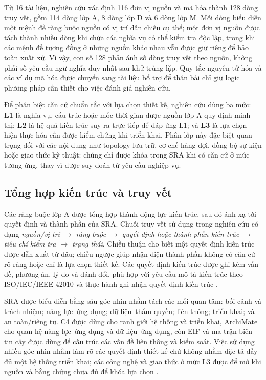 Từ 16 tài liệu, nghiên cứu xác định 116 đơn vị nguồn và mã hóa thành 128 dòng truy vết, gồm 114 dòng lớp A, 8 dòng lớp D và 6 dòng lớp M. Mỗi dòng biểu diễn một mệnh đề ràng buộc nguồn có vị trí dẫn chiếu cụ thể; một đơn vị nguồn được tách thành nhiều dòng khi chứa các nghĩa vụ có thể kiểm tra độc lập, trong khi các mệnh đề tương đồng ở những nguồn khác nhau vẫn được giữ riêng để bảo toàn xuất xứ. Vì vậy, con số 128 phản ánh số dòng truy vết theo nguồn, không phải số yêu cầu ngữ nghĩa duy nhất sau khử trùng lặp. Quy tắc nguyên tử hóa và các ví dụ mã hóa được chuyển sang tài liệu bổ trợ để thân bài chỉ giữ logic phương pháp cần thiết cho việc đánh giá nghiên cứu.

Để phân biệt căn cứ chuẩn tắc với lựa chọn thiết kế, nghiên cứu dùng ba mức: \textbf{L1} là nghĩa vụ, cấu trúc hoặc mốc thời gian được nguồn lớp A quy định minh thị; \textbf{L2} là hệ quả kiến trúc suy ra trực tiếp để đáp ứng L1; và \textbf{L3} là lựa chọn hiện thực hóa cần được kiểm chứng khi triển khai. Phân lớp này đặc biệt quan trọng đối với các nội dung như topology lưu trữ, cơ chế hàng đợi, đồng bộ sự kiện hoặc giao thức kỹ thuật: chúng chỉ được khóa trong SRA khi có căn cứ ở mức tương ứng, thay vì được suy đoán từ yêu cầu nghiệp vụ.

\subsection{Tổng hợp kiến trúc và truy vết}
\label{subsec:formalization}

Các ràng buộc lớp A được tổng hợp thành động lực kiến trúc, sau đó ánh xạ tới quyết định và thành phần của SRA. Chuỗi truy vết sử dụng trong nghiên cứu có dạng \emph{nguồn/vị trí $\rightarrow$ ràng buộc $\rightarrow$ quyết định hoặc thành phần kiến trúc $\rightarrow$ tiêu chí kiểm tra $\rightarrow$ trạng thái}. Chiều thuận cho biết một quyết định kiến trúc được dẫn xuất từ đâu; chiều ngược giúp nhận diện thành phần không có căn cứ rõ ràng hoặc chỉ là lựa chọn thiết kế. Các quyết định kiến trúc được ghi kèm vấn đề, phương án, lý do và đánh đổi, phù hợp với yêu cầu mô tả kiến trúc theo ISO/IEC/IEEE 42010 và thực hành ghi nhận quyết định kiến trúc \citep[pp.~19--27]{tyree2005}.

SRA được biểu diễn bằng sáu góc nhìn nhằm tách các mối quan tâm: bối cảnh và trách nhiệm; năng lực--ứng dụng; dữ liệu--thẩm quyền; liên thông; triển khai; và an toàn/riêng tư. C4 được dùng cho ranh giới hệ thống và triển khai, ArchiMate cho quan hệ năng lực--ứng dụng và dữ liệu--ứng dụng, còn EIF và ma trận biên tin cậy được dùng để cấu trúc các vấn đề liên thông và kiểm soát. Việc sử dụng nhiều góc nhìn nhằm làm rõ các quyết định thiết kế chứ không nhằm đặc tả đầy đủ một hệ thống triển khai; các công nghệ và giao thức ở mức L3 được để mở khi nguồn và bằng chứng chưa đủ để khóa lựa chọn \citep{c4model2026}\citep[Chs.~5, 7, 9; Apps.~A--C]{archimate32_2023}.

